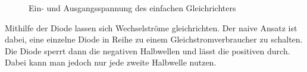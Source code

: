 \documentclass[a4paper,german,12pt,smallheadings]{scrartcl}
\begin{document}
\begin{figure}[H]
  \begin{center}
    \caption{Ein- und Ausgangsspannung des einfachen Gleichrichters}
    \label{img:simprectout}
  \end{center}
\end{figure}

Mithilfe der Diode lassen sich Wechselströme gleichrichten. Der naive Ansatz
ist dabei, eine einzelne Diode in Reihe zu einem Gleichstromverbraucher zu
schalten. Die Diode sperrt dann die negativen Halbwellen und lässt die
positiven durch. Dabei kann man jedoch nur jede zweite Halbwelle nutzen.
\end{document}
